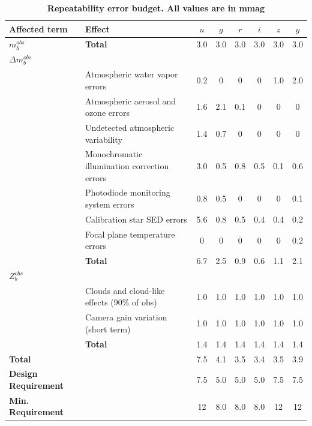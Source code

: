 \documentclass[12pt,preprint]{aastex}
\begin{document}
\begin{landscape}
\begin{center}
\begin{table}[htb]
\caption{{\bf Repeatability error budget.  All values are in mmag} }
\begin{tabular}{l | l | c c c c c c }
Affected term & Effect &  $u$  & $g$ & $r$ & $i$ & $z$ & $y$ \\ \hline
{\bf $m_b^{obs}$} & {\bf Total} & 3.0 & 3.0 & 3.0 & 3.0 & 3.0 & 3.0 \\ \hline
{\bf $\Delta m_b^{obs}$} & & & & \\
& Atmospheric water vapor errors & 0.2 & 0 & 0 & 0 & 1.0 & 2.0  \\
& Atmospheric aerosol and ozone errors & 1.6 & 2.1 & 0.1 & 0 & 0 & 0  \\
& Undetected atmospheric variability & 1.4 & 0.7 & 0 & 0 & 0 & 0 \\
& Monochromatic illumination correction errors & 3.0 & 0.5 & 0.8 & 0.5 & 0.1 & 0.6\\
& Photodiode monitoring system errors & 0.8 & 0.5 & 0 & 0 & 0 & 0.1 \\
& Calibration star SED errors & 5.6 & 0.8 & 0.5 & 0.4 & 0.4 & 0.2 \\
& Focal plane temperature errors & 0 & 0 & 0 & 0 & 0 & 0.2 \\ 
& {\bf Total} & 6.7 & 2.5 & 0.9 & 0.6 & 1.1 & 2.1 \\ \hline
$Z_b^{obs}$ & & & & \\
& Clouds and cloud-like effects (90\% of obs) & 1.0 & 1.0 & 1.0 & 1.0 & 1.0 & 1.0 \\
& Camera gain variation (short term) & 1.0 & 1.0 & 1.0 & 1.0 & 1.0 & 1.0 \\
& {\bf Total} & 1.4 & 1.4 & 1.4 & 1.4 & 1.4 & 1.4 \\ \hline
{\bf Total} & & 7.5 & 4.1 & 3.5 & 3.4 & 3.5 & 3.9 \\ \hline
{\bf Design Requirement} & & 7.5 & 5.0 & 5.0 & 5.0 & 7.5 & 7.5 \\ 
{\bf Min. Requirement} & & 12 & 8.0 & 8.0 & 8.0 & 12 & 12 \\
\end{tabular}
\label{tab:rpt_error_budget}
\end{table}
\end{center}
\end{landscape}

\clearpage
\end{document}
